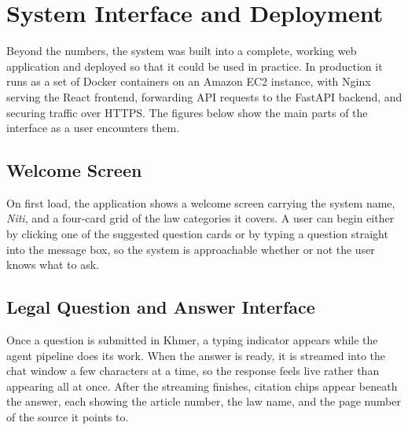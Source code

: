 

\section{System Interface and Deployment}

\hs Beyond the numbers, the system was built into a complete, working web application and
deployed so that it could be used in practice. In production it runs as a set of Docker
containers on an Amazon EC2 instance, with Nginx serving the React frontend, forwarding
API requests to the FastAPI backend, and securing traffic over HTTPS. The figures below
show the main parts of the interface as a user encounters them.

\subsection{Welcome Screen}

\hs On first load, the application shows a welcome screen carrying the system name,
\textit{Niti}, and a four-card grid of the law categories it covers. A user can begin
either by clicking one of the suggested question cards or by typing a question straight
into the message box, so the system is approachable whether or not the user knows what to
ask.


\subsection{Legal Question and Answer Interface}

\hs Once a question is submitted in Khmer, a typing indicator appears while the agent
pipeline does its work. When the answer is ready, it is streamed into the chat window a few
characters at a time, so the response feels live rather than appearing all at once. After
the streaming finishes, citation chips appear beneath the answer, each showing the article
number, the law name, and the page number of the source it points to.



